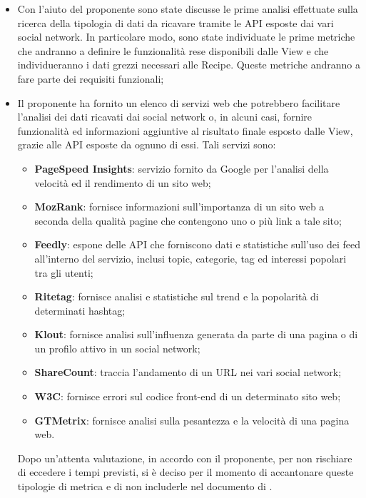 \begin{itemize}
 	\item Con l'aiuto del proponente sono state discusse le prime analisi effettuate sulla ricerca della tipologia di dati da ricavare tramite le API esposte dai vari social network. In particolare modo, sono state individuate le prime metriche che andranno a definire le funzionalità rese disponibili dalle View e che individueranno i dati grezzi necessari alle Recipe. Queste metriche andranno a fare parte dei requisiti funzionali;
	\item Il proponente ha fornito un elenco di servizi web che potrebbero facilitare l'analisi dei dati ricavati dai social network o, in alcuni casi, fornire funzionalità ed informazioni aggiuntive al risultato finale esposto dalle View, grazie alle API esposte da ognuno di essi. Tali servizi sono:
  	\begin{itemize}
    	\item \textbf{PageSpeed Insights}: servizio fornito da Google per l'analisi della velocità ed il rendimento di un sito web;
    	\item \textbf{MozRank}: fornisce informazioni sull'importanza di un sito web a seconda della qualità pagine che contengono uno o più link a tale sito;
    	\item \textbf{Feedly}: espone delle API che forniscono dati e statistiche sull'uso dei feed all'interno del servizio, inclusi topic, categorie, tag ed interessi popolari tra gli utenti;
    	\item \textbf{Ritetag}: fornisce analisi e statistiche sul trend e la popolarità di determinati hashtag;
    	\item \textbf{Klout}: fornisce analisi sull'influenza generata da parte di una pagina o di un profilo attivo in un social network;
    	\item \textbf{ShareCount}: traccia l'andamento di un URL nei vari social network;
    	\item \textbf{W3C}: fornisce errori sul codice front-end di un determinato sito web;
    	\item \textbf{GTMetrix}: fornisce analisi sulla pesantezza e la velocità di una pagina web.
  	\end{itemize}
	\noindent
	Dopo un'attenta valutazione, in accordo con il proponente, per non rischiare di eccedere i tempi previsti, si è deciso per il momento di accantonare queste tipologie di metrica e di non includerle nel documento di \docNameVersionAdR.
\end{itemize}
